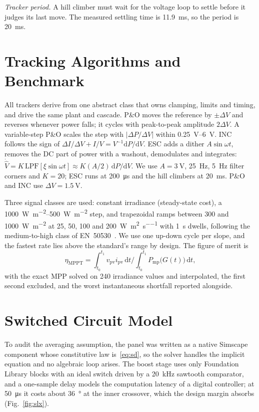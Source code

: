 \documentclass[journal]{IEEEtran}
\newcommand{\vpv}{v_{\mathrm{pv}}}
\newcommand{\ipv}{i_{\mathrm{pv}}}
\newcommand{\Pmp}{P_{\mathrm{mp}}}
\newcommand{\Wm}{\si{\watt\per\square\metre}}
\newcommand{\Wms}{\si{\watt\per\square\metre\per\second}}
\begin{document}
\emph{Tracker period.} A hill climber must wait for the voltage loop to settle before it judges its last
move. The measured settling time is \SI{11.9}{\milli\second}, so the period is \SI{20}{\milli\second}.

\section{Tracking Algorithms and Benchmark}
\label{sec:mppt}
All trackers derive from one abstract class that owns clamping, limits and timing, and drive the same
plant and cascade. P\&O moves the reference by $\pm\Delta V$ and reverses whenever power falls; it cycles
with peak-to-peak amplitude $2\Delta V$. A variable-step P\&O scales the step with $|\Delta P/\Delta V|$
within \SIrange{0.25}{6}{\volt}. INC~\cite{hussein} follows the sign of
$\Delta I/\Delta V + I/V = V^{-1}\mathrm{d}P/\mathrm{d}V$. ESC adds a dither $A\sin\omega t$, removes the DC part
of power with a washout, demodulates and integrates:
$\dot{\hat V} = K\,\mathrm{LPF}[\xi\sin\omega t] \approx K(A/2)\,\mathrm{d}P/\mathrm{d}V$. We use
$A=\SI{3}{\volt}$, \SI{25}{\hertz}, \SI{5}{\hertz} filter corners and $K=20$; ESC runs at
\SI{200}{\micro\second} and the hill climbers at \SI{20}{\milli\second}. P\&O and INC use
$\Delta V = \SI{1.5}{\volt}$.

Three signal classes are used: constant irradiance (steady-state cost), a \SIrange{1000}{500}{\Wm} step, and
trapezoidal ramps between 300 and \SI{1000}{\Wm} at 25, 50, 100 and \SI{200}{\Wms} with \SI{1}{\second}
dwells, following the medium-to-high class of EN~50530~\cite{en50530}. We use one up-down cycle per slope,
and the fastest rate lies above the standard's range by design. The figure of merit is
\begin{equation}
\eta_{\mathrm{MPPT}} = \int_{t_0}^{t_1}\vpv\ipv\,\mathrm{d}t \Big/ \int_{t_0}^{t_1}\Pmp\big(G(t)\big)\,\mathrm{d}t ,
\label{eq:eta}
\end{equation}
with the exact MPP solved on 240 irradiance values and interpolated, the first second excluded, and the
worst instantaneous shortfall reported alongside.

\section{Switched Circuit Model}
\label{sec:switched}
To audit the averaging assumption, the panel was written as a native Simscape component whose
constitutive law is~\eqref{eq:sd}, so the solver handles the implicit equation and no algebraic loop arises.
The boost stage uses only Foundation Library blocks with an ideal switch driven by a \SI{20}{\kilo\hertz}
sawtooth comparator, and a one-sample delay models the computation latency of a digital controller; at
\SI{50}{\micro\second} it costs about \SI{36}{\degree} at the inner crossover, which the design margin
absorbs (Fig.~\ref{fig:slx}).
\end{document}
